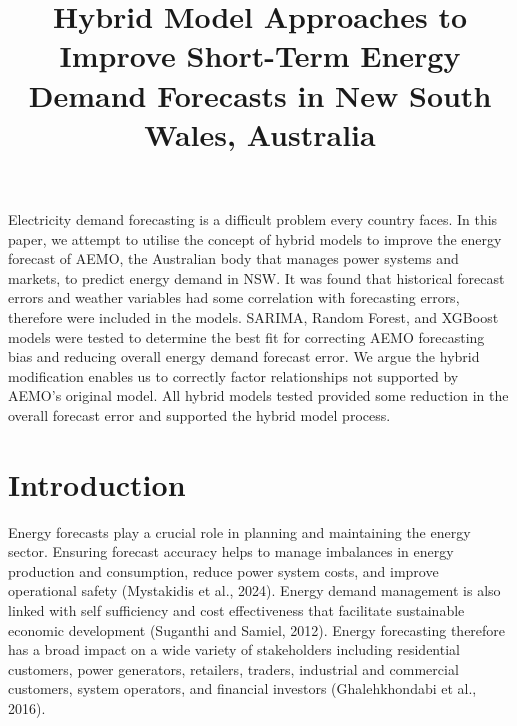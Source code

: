 \documentclass[mstat,12pt]{unswthesis}
\title{Hybrid Model Approaches to Improve Short-Term Energy Demand Forecasts in New South Wales, Australia}
\author{\Authornameonly}
\begin{document}
\beforepreface


Electricity demand forecasting is a difficult problem every country faces. In this paper, we attempt to utilise the concept of hybrid models to improve the energy forecast of AEMO, the Australian body that manages power systems and markets, to predict energy demand in NSW. It was found that historical forecast errors and weather variables had some correlation with forecasting errors, therefore were included in the models. SARIMA, Random Forest, and XGBoost models were tested to determine the best fit for correcting AEMO forecasting bias and reducing overall energy demand forecast error. We argue the hybrid modification enables us to correctly factor relationships not supported by AEMO's original model. All hybrid models tested provided some reduction in the overall forecast error and supported the hybrid model process.

\afterpreface





%
%






\chapter{Introduction}\label{introduction}

Energy forecasts play a crucial role in planning and maintaining the energy sector. Ensuring forecast accuracy helps to manage imbalances in energy production and consumption, reduce power system costs, and improve operational safety (Mystakidis et al., 2024). Energy demand management is also linked with self sufficiency and cost effectiveness that facilitate sustainable economic development (Suganthi and Samiel, 2012). Energy forecasting therefore has a broad impact on a wide variety of stakeholders including residential customers, power generators, retailers, traders, industrial and commercial customers, system operators, and financial investors (Ghalehkhondabi et al., 2016).

\bigskip
\end{document}
